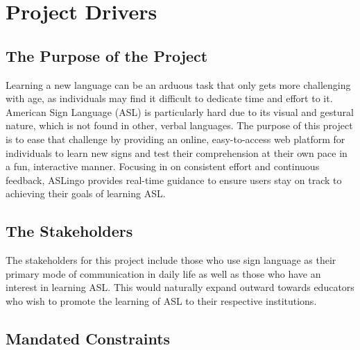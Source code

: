 \documentclass[12pt, titlepage]{article}
\begin{document}
\section{Project Drivers}

\subsection{The Purpose of the Project}

Learning a new language can be an arduous task that only gets more challenging
with age, as individuals may find it difficult to dedicate time and effort to
it. American Sign Language (ASL) is particularly hard due to its visual and
gestural nature, which is not found in other, verbal languages. The purpose of this project is
to ease that challenge by providing an online, easy-to-access web platform for
individuals to learn new signs and test their comprehension at their own pace
in a fun, interactive manner. Focusing in on consistent effort and continuous
feedback, ASLingo provides real-time guidance to ensure users stay on track to
achieving their goals of learning ASL.

\subsection{The Stakeholders}

 The stakeholders for this project include those who use sign language as their primary mode of communication in daily life as well as those who have an interest in learning ASL. This would naturally expand outward towards educators who wish to promote the learning of ASL to their respective institutions. 




\subsection{Mandated Constraints}
\end{document}
